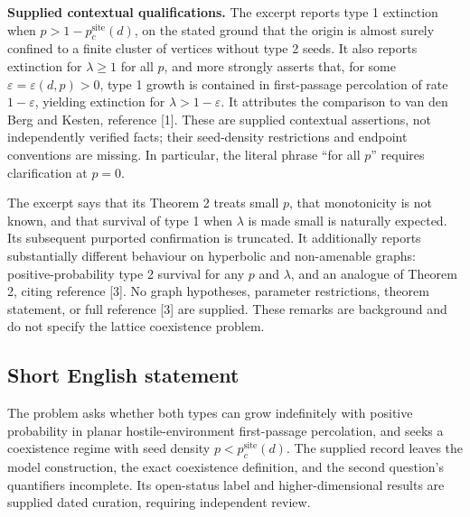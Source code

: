 \documentclass[11pt]{article}
\begin{document}
\textbf{Supplied contextual qualifications.} The excerpt reports type 1 extinction when \(p>1-p_c^{\mathrm{site}}(d)\), on the stated ground that the origin is almost surely confined to a finite cluster of vertices without type 2 seeds. It also reports extinction for \(\lambda\geq1\) for all \(p\), and more strongly asserts that, for some \(\varepsilon=\varepsilon(d,p)>0\), type 1 growth is contained in first-passage percolation of rate \(1-\varepsilon\), yielding extinction for \(\lambda>1-\varepsilon\). It attributes the comparison to van den Berg and Kesten, reference [1]. These are supplied contextual assertions, not independently verified facts; their seed-density restrictions and endpoint conventions are missing. In particular, the literal phrase ``for all \(p\)'' requires clarification at \(p=0\).

The excerpt says that its Theorem 2 treats small \(p\), that monotonicity is not known, and that survival of type 1 when \(\lambda\) is made small is naturally expected. Its subsequent purported confirmation is truncated. It additionally reports substantially different behaviour on hyperbolic and non-amenable graphs: positive-probability type 2 survival for any \(p\) and \(\lambda\), and an analogue of Theorem 2, citing reference [3]. No graph hypotheses, parameter restrictions, theorem statement, or full reference [3] are supplied. These remarks are background and do not specify the lattice coexistence problem.
\subsection{Short English statement}
The problem asks whether both types can grow indefinitely with positive probability in planar hostile-environment first-passage percolation, and seeks a coexistence regime with seed density \(p<p_c^{\mathrm{site}}(d)\). The supplied record leaves the model construction, the exact coexistence definition, and the second question's quantifiers incomplete. Its open-status label and higher-dimensional results are supplied dated curation, requiring independent review.
\end{document}
